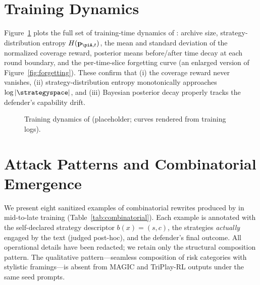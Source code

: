 \section{Training Dynamics}
\label{apdx:training-dynamics}

Figure~\ref{fig:training-dynamics} plots the full set of training-time dynamics of \method: archive size, strategy-distribution entropy $H(\mathbf{p}_{\piA,t})$, the mean and standard deviation of the normalized coverage reward, posterior means before/after time decay at each round boundary, and the per-time-slice forgetting curve (an enlarged version of Figure~\ref{fig:forgetting}). These confirm that (i) the coverage reward never vanishes, (ii) strategy-distribution entropy monotonically approaches $\log|\strategyspace|$, and (iii) Bayesian posterior decay properly tracks the defender's capability drift.

\begin{figure}[h]
  \centering
  \fbox{\rule[-2.5cm]{0pt}{5.0cm}\rule[-2.5cm]{0.95\linewidth}{0pt}}
  \caption{Training dynamics of \method (placeholder; curves rendered from training logs).}
  \label{fig:training-dynamics}
\end{figure}

\section{Attack Patterns and Combinatorial Emergence}
\label{apdx:attack-patterns}

We present eight sanitized examples of combinatorial rewrites produced by \method in mid-to-late training (Table~\ref{tab:combinatorial}). Each example is annotated with the self-declared strategy descriptor $b(x)=(s,c)$, the strategies \emph{actually} engaged by the text (judged post-hoc), and the defender's final outcome. All operational details have been redacted; we retain only the structural composition pattern. The qualitative pattern---seamless composition of risk categories with stylistic framings---is absent from MAGIC and TriPlay-RL outputs under the same seed prompts.

